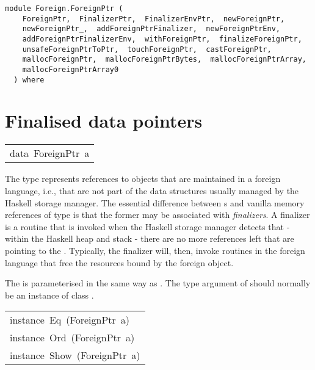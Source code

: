 \label{module:Foreign.ForeignPtr}
\haddockbeginheader
{\haddockverb\begin{verbatim}
module Foreign.ForeignPtr (
    ForeignPtr,  FinalizerPtr,  FinalizerEnvPtr,  newForeignPtr, 
    newForeignPtr_,  addForeignPtrFinalizer,  newForeignPtrEnv, 
    addForeignPtrFinalizerEnv,  withForeignPtr,  finalizeForeignPtr, 
    unsafeForeignPtrToPtr,  touchForeignPtr,  castForeignPtr, 
    mallocForeignPtr,  mallocForeignPtrBytes,  mallocForeignPtrArray, 
    mallocForeignPtrArray0
  ) where\end{verbatim}}
\haddockendheader

\section{Finalised data pointers
}
\begin{haddockdesc}
\item[\begin{tabular}{@{}l}
data\ ForeignPtr\ a
\end{tabular}]\haddockbegindoc
The type  represents references to objects that are
 maintained in a foreign language, i.e., that are not part of the
 data structures usually managed by the Haskell storage manager.
 The essential difference between s and vanilla memory
 references of type  is that the former may be associated
 with \emph{finalizers}. A finalizer is a routine that is invoked when
 the Haskell storage manager detects that - within the Haskell heap
 and stack - there are no more references left that are pointing to
 the .  Typically, the finalizer will, then, invoke
 routines in the foreign language that free the resources bound by
 the foreign object.
\par
The  is parameterised in the same way as .  The
 type argument of  should normally be an instance of
 class .
\par

\end{haddockdesc}
\begin{haddockdesc}
\item[\begin{tabular}{@{}l}
instance\ Eq\ (ForeignPtr\ a)\\instance\ Ord\ (ForeignPtr\ a)\\instance\ Show\ (ForeignPtr\ a)
\end{tabular}]
\end{haddockdesc}
